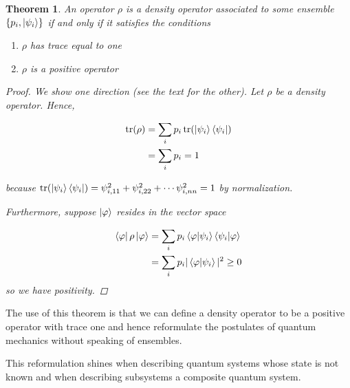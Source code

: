 \documentclass[11pt]{article}
\newcommand\0{\mathbf{0}}
\newcommand\<{\langle}
\renewcommand\>{\rangle}
\renewcommand\phi{\varphi}
\newtheorem{theorem}{Theorem}[section]
\begin{document}
\begin{theorem}
An operator $\rho$ is a density operator associated to some ensemble $\{p_i, \ket{\psi_i}\}$ if and only if it satisfies the conditions

\begin{enumerate}
\item $\rho$ has trace equal to one
\item $\rho$ is a positive operator	
\end{enumerate}

\begin{proof}
	We show one direction (see the text for the other). Let $\rho$ be a density operator. Hence,
	
	\begin{align*}
	\tr(\rho) &= \sum_i p_i \tr(\ket{\psi_i}\bra{\psi_i}) \\
	&= 	\sum_i p_i =1
	\end{align*}

because $\tr(\ket{\psi_i}\bra{\psi_i}) = \psi_{i, 11}^2 + \psi_{i, 22}^2 + \cdots \psi_{i, nn}^2 = 1$ by normalization. 

Furthermore, suppose $\ket{\phi}$ resides in the vector space

\begin{align*}
\bra{\phi} \rho \ket{\phi} &= \sum_i p_i \bra{\phi}\ket{\psi_i}\bra{\psi_i}\ket{\phi} \\
&= \sum_i p_i |\bra{\phi}\ket{\psi_i}|^2 \geq 0
\end{align*}
so we have positivity.
\end{proof}	
\end{theorem}

The use of this theorem is that we can define a density operator to be a positive operator with trace one and hence reformulate the postulates of quantum mechanics without speaking of ensembles.

This reformulation shines when describing quantum systems whose state is not known and when describing subsystems a composite quantum system.
\end{document}
